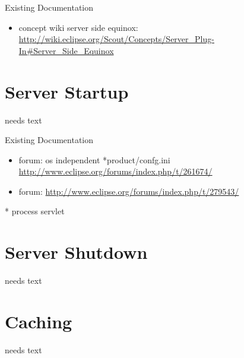 \documentclass[a4paper,10pt,twoside]{book}
\begin{document}
\noindent Existing Documentation
\begin{itemize}
  \item concept wiki server side equinox: \url{http://wiki.eclipse.org/Scout/Concepts/Server_Plug-In#Server_Side_Equinox}
\end{itemize}

\section{Server Startup}
needs text

\noindent Existing Documentation
\begin{itemize}
  \item forum: os independent *product/confg.ini \url{http://www.eclipse.org/forums/index.php/t/261674/}
  \item forum: \url{http://www.eclipse.org/forums/index.php/t/279543/}
\end{itemize}

  * process servlet

\section{Server Shutdown}
needs text


\begin{table}
\begin{center}
\caption{Numbers of distinct differentiable structures on real $n$-space
and $n$-spheres}
\label{diffstruc}
\end{center}
\end{table}

\section{Caching}
needs text



\ifx\wholebook\relax\else
   
   
\end{document}
